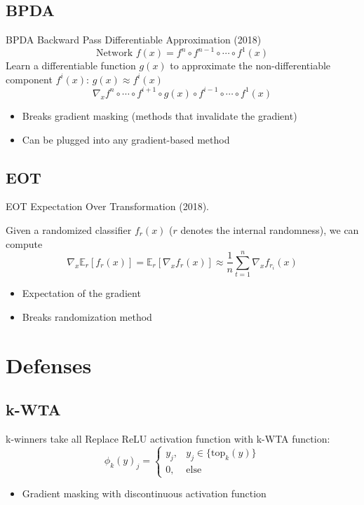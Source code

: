 \documentclass[12,times]{beamer}
\begin{document}
\subsection{BPDA}
\begin{frame}{BPDA}
	Backward Pass Differentiable Approximation (2018)
	$$ \text{Network } f(x) = f^n \circ f^{n-1} \circ \cdots \circ f^1(x) $$
	Learn a differentiable function $g(x)$ to approximate the non-differentiable component $f^i(x)$: $g(x)\approx f^i(x)$ 
	$$\nabla_x f^n \circ \cdots \circ f^{i+1} \circ g(x) \circ f^{i-1} \circ \cdots \circ f^1(x) $$
	\begin{itemize}
		\item Breaks gradient masking (methods that invalidate the gradient)
		\item Can be plugged into any gradient-based method
	\end{itemize}
\end{frame}

\subsection{EOT}
\begin{frame}{EOT}
	Expectation Over Transformation (2018).
	
	Given a randomized classifier $f_r(x)$ ($r$ denotes the internal randomness), we can compute
	$$ \nabla_x \mathbb{E}_r [f_r(x)] 
	= \mathbb{E}_r[\nabla_x f_r(x)]
	\approx \frac{1}{n} \sum_{t=1}^n \nabla_x f_{r_i}(x)$$
	\begin{itemize}
		\item Expectation of the gradient
		\item Breaks randomization method
	\end{itemize}
\end{frame}

\section{Defenses}

\subsection{k-WTA}
\begin{frame}{k-winners take all}
	Replace ReLU activation function with k-WTA function:
	$$ \phi_k (y)_j = \left\{ 
	\begin{aligned}
	y_j,& y_j\in \{\text{top}_k(y)\}\\
	0,& \text{else}
	\end{aligned}\right.
	$$
	\begin{itemize}
		\item Gradient masking with discontinuous activation function
	\end{itemize}

\end{frame}
\end{document}
